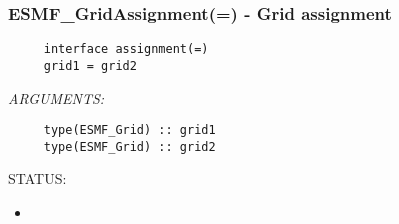  
\setlength{\oldparskip}{\parskip}
\setlength{\parskip}{1.5ex}
\setlength{\oldparindent}{\parindent}
\setlength{\parindent}{0pt}
\setlength{\oldbaselineskip}{\baselineskip}
\setlength{\baselineskip}{11pt}
 
\def\bv{\begin{verbatim}}
\def\ev{\end{verbatim}}
\def\be{\begin{equation}}
\def\ee{\end{equation}}
\def\bea{\begin{eqnarray}}
\def\eea{\end{eqnarray}}
\def\bi{\begin{itemize}}
\def\ei{\end{itemize}}
\def\bn{\begin{enumerate}}
\def\en{\end{enumerate}}
\def\bd{\begin{description}}
\def\ed{\end{description}}
\def\({\left (}
\def\){\right )}
\def\[{\left [}
\def\]{\right ]}
\def\<{\left  \langle}
\def\>{\right \rangle}
\def\cI{{\cal I}}
\def\diag{\mathop{\rm diag}}
\def\tr{\mathop{\rm tr}}


 
\subsubsection [ESMF\_GridAssignment(=)] {ESMF\_GridAssignment(=) - Grid assignment}


  
\begin{verbatim}     interface assignment(=)
     grid1 = grid2\end{verbatim}{\em ARGUMENTS:}
\begin{verbatim}     type(ESMF_Grid) :: grid1
     type(ESMF_Grid) :: grid2\end{verbatim}
{\sf STATUS:}
   \begin{itemize}
   \item{}
   \end{itemize}
  
